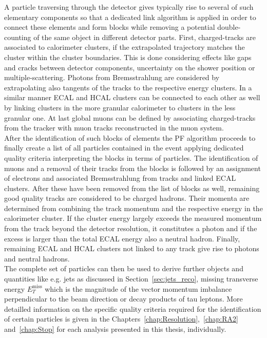 A particle traversing through the detector gives typically rise to several of such elementary components so that a dedicated link algorithm is applied in order to connect these elements and form blocks while removing a potential double-counting of the same object in different detector parts. First, charged-tracks are associated to calorimeter clusters, if the extrapolated trajectory matches the cluster within the cluster boundaries. This is done considering effects like gaps and cracks between detector components, uncertainty on the shower position or multiple-scattering. Photons from Bremsstrahlung are considered by extrapolating also tangents of the tracks to the respective energy clusters. In a similar manner ECAL and HCAL clusters can be connected to each other as well by linking clusters in the more granular calorimeter to clusters in the less granular one. At last global muons can be defined by associating charged-tracks from the tracker with muon tracks reconstructed in the muon system. \\
After the identification of such blocks of elements the PF algorithm proceeds to finally create a list of all particles contained in the event applying dedicated quality criteria interpreting the blocks in terms of particles. The identification of muons and a removal of their tracks from the blocks is followed by an assignment of electrons and associated Bremsstrahlung from tracks and linked ECAL clusters. After these have been removed from the list of blocks as well, remaining good quality tracks are considered to be charged hadrons. Their momenta are determined from combining the track momentum and the respective energy in the calorimeter cluster. If the cluster energy largely exceeds the measured momentum from the track beyond the detector resolution, it constitutes a photon and if the excess is larger than the total ECAL energy also a neutral hadron. Finally, remaining ECAL and HCAL clusters not linked to any track give rise to photons and neutral hadrons. \\
The complete set of particles can then be used to derive further objects and quantities like e.g. jets as discussed in Section~\ref{sec:jets_reco}, missing transverse energy $E_{T}^{\mathrm{miss}}$ which is the magnitude of the vector momentum imbalance perpendicular to the beam direction or decay products of tau leptons. More detailled information on the specific quality criteria required for the identification of certain particles is given in the Chapters~\ref{chap:Resolution},~\ref{chap:RA2} and~\ref{chap:Stop} for each analysis presented in this thesis, individually.

